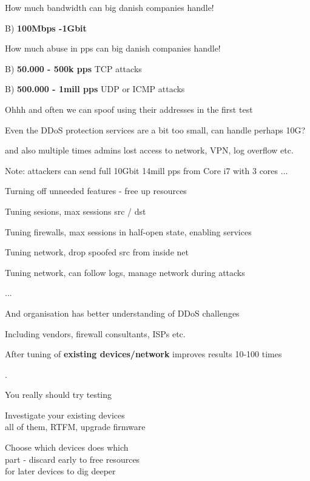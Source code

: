 \documentclass[20pt,landscape,a4paper,footrule]{foils}
\begin{document}




How much bandwidth can big danish companies handle!
\begin{list2}
\item B) {\bf 100Mbps -1Gbit}
\end{list2}

How much abuse in pps can big danish companies handle!
\begin{list2}
\item B) {\bf 50.000 - 500k pps} TCP attacks
\item B) {\bf 500.000 - 1mill pps} UDP or ICMP attacks
\item Ohhh and often we can spoof using their addresses in the first test
\end{list2}

Even the DDoS protection services are a bit too small, can handle perhaps 10G?

and also multiple times admins lost access to network, VPN, log overflow etc.

\vskip 2cm
Note: attackers can send full 10Gbit 14mill pps from Core i7 with 3 cores ...


\begin{list1}
\item Turning off unneeded features - free up resources
\item Tuning sesions, max sessions src / dst
\item Tuning firewalls, max sessions in half-open state, enabling services
\item Tuning network, drop spoofed src from inside net \smiley
\item Tuning network, can follow logs, manage network during attacks
\item ...
\item And organisation has better understanding of DDoS challenges
\item Including vendors, firewall consultants, ISPs etc.
\end{list1}

\vskip 1cm
\centerline{After tuning of {\bf existing devices/network} improves results 10-100 times}


.
\begin{list1}
\item You really should try testing
\item Investigate your existing devices\\
all of them, RTFM, upgrade firmware
\item Choose which devices does which\\
part - discard early to free resources\\
for later devices to dig deeper
\end{list1}
\end{document}
